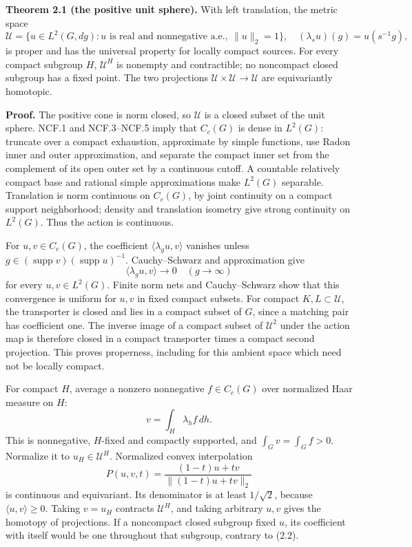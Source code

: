 \documentclass[
  11pt,
]{article}
\begin{document}
\textbf{Theorem 2.1 (the positive unit sphere).} With left translation,
the metric space \[
 \mathcal U=\{u\in L^2(G,dg):u\text{ is real and nonnegative a.e.},\ \|u\|_2=1\},
 \quad (\lambda_su)(g)=u(s^{-1}g),
 \tag{2.1}
\] is proper and has the universal property for locally compact sources.
For every compact subgroup \(H\), \(\mathcal U^H\) is nonempty and
contractible; no noncompact closed subgroup has a fixed point. The two
projections \(\mathcal U\times\mathcal U\to\mathcal U\) are
equivariantly homotopic.

\textbf{Proof.} The positive cone is norm closed, so \(\mathcal U\) is a
closed subset of the unit sphere. NCF.1 and NCF.3--NCF.5 imply that
\(C_c(G)\) is dense in \(L^2(G)\): truncate over a compact exhaustion,
approximate by simple functions, use Radon inner and outer
approximation, and separate the compact inner set from the complement of
its open outer set by a continuous cutoff. A countable relatively
compact base and rational simple approximations make \(L^2(G)\)
separable. Translation is norm continuous on \(C_c(G)\), by joint
continuity on a compact support neighborhood; density and translation
isometry give strong continuity on \(L^2(G)\). Thus the action is
continuous.

For \(u,v\in C_c(G)\), the coefficient \(\langle\lambda_g u,v\rangle\)
vanishes unless
\(g\in(\operatorname{supp}v)(\operatorname{supp}u)^{-1}\).
Cauchy--Schwarz and approximation give \[
                   \langle\lambda_gu,v\rangle\longrightarrow0
                   \quad(g\longrightarrow\infty)
 \tag{2.2}
\] for every \(u,v\in L^2(G)\). Finite norm nets and Cauchy--Schwarz
show that this convergence is uniform for \(u,v\) in fixed compact
subsets. For compact \(K,L\subset\mathcal U\), the transporter is closed
and lies in a compact subset of \(G\), since a matching pair has
coefficient one. The inverse image of a compact subset of
\(\mathcal U^2\) under the action map is therefore closed in a compact
transporter times a compact second projection. This proves properness,
including for this ambient space which need not be locally compact.

For compact \(H\), average a nonzero nonnegative \(f\in C_c(G)\) over
normalized Haar measure on \(H\): \[
 v=\int_H\lambda_hf\,dh.
\] This is nonnegative, \(H\)-fixed and compactly supported, and
\(\int_Gv=\int_Gf>0\). Normalize it to \(u_H\in\mathcal U^H\).
Normalized convex interpolation \[
              P(u,v,t)=\frac{(1-t)u+tv}{\|(1-t)u+tv\|_2}
 \tag{2.3}
\] is continuous and equivariant. Its denominator is at least
\(1/\sqrt2\), because \(\langle u,v\rangle\ge0\). Taking \(v=u_H\)
contracts \(\mathcal U^H\), and taking arbitrary \(u,v\) gives the
homotopy of projections. If a noncompact closed subgroup fixed \(u\),
its coefficient with itself would be one throughout that subgroup,
contrary to (2.2).
\end{document}

